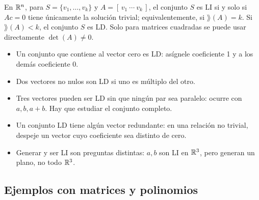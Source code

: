 \documentclass[compacto,10pt]{pubciencias-notas}
\begin{document}
\begin{obs}
    En $\mathbb{R}^n$, para $S=\{v_1,\ldots,v_k\}$ y
    $A=[\,v_1\ \cdots\ v_k\,]$, el conjunto $S$ es LI si
    y solo si $Ac=0$ tiene únicamente la solución trivial; equivalentemente,
    si $\rang(A)=k$. Si $\rang(A)<k$, el conjunto $S$ es LD.
    Solo para matrices cuadradas se puede usar directamente $\det(A)\ne0$.
\end{obs}
\begin{obs}
    \leavevmode\par
    \begin{itemize}[leftmargin=*,labelsep=0.5em]
        \item Un conjunto que contiene al vector cero es LD: asígnele
              coeficiente 1 y a los demás coeficiente 0.
        \item Dos vectores no nulos son LD si uno es múltiplo del otro.
        \item Tres vectores pueden ser LD sin que ningún par sea paralelo:
              ocurre con $a,b,a+b$. Hay que estudiar el conjunto completo.
        \item Un conjunto LD tiene algún vector redundante: en una relación
              no trivial, despeje un vector cuyo coeficiente sea distinto de cero.
        \item Generar y ser LI son preguntas distintas: $a,b$ son LI en
              $\mathbb{R}^3$, pero generan un plano, no todo $\mathbb{R}^3$.
    \end{itemize}
\end{obs}

\subsection{Ejemplos con matrices y polinomios}
\end{document}
